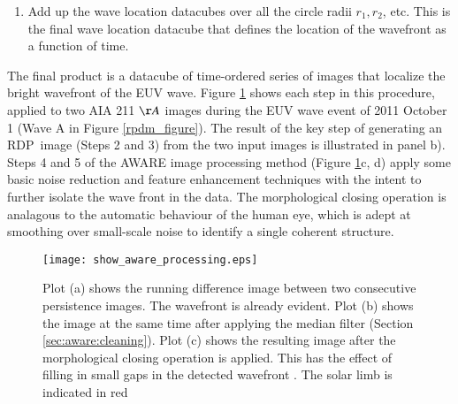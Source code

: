 \documentclass[referee,a4paper,12pt,traditabstract]{swsc}
\newcommand{\RDP}{RDP}
\begin{document}
\begin{linenumbers}
\begin{enumerate}
\begin{enumerate}
\item Apply a morphological closing operation.  This operation helps
  close small ‘cracks’ in structures \citep{2002dip..book.....G}.  The
  structuring element used is the same as that used by the median
  filtering operation. The final image is shown in Figure
  \ref{method_figure}d.  The final result is a datacube of images that
  show the location of the wavefront as a function of time, given the
  median filter and closing operations performed at length-scale $r$.
\end{enumerate}

\item Add up the wave location datacubes over all the circle radii
  $r_{1}, r_{2}$\textellipsis, etc.  This is the final wave location
  datacube that defines the location of the wavefront as a function of
  time.

\end{enumerate}

The final product is a datacube of time-ordered series of images that
localize the bright wavefront of the EUV wave.  Figure
\ref{method_figure} shows each step in this procedure, applied to two
AIA 211 $\AA$ images during the EUV wave event of 2011 October 1 (Wave
A in Figure \ref{rpdm_figure}).  The result of the key step of
generating an \RDP\ image (Steps 2 and 3) from the two input images is
illustrated in panel b). Steps 4 and 5 of the AWARE image processing
method (Figure \ref{method_figure}c, d) apply some basic noise
reduction and feature enhancement techniques with the intent to
further isolate the wave front in the data. The morphological closing
operation is analagous to the automatic behaviour of the human eye,
which is adept at smoothing over small-scale noise to identify a
single coherent structure.

\begin{figure}
\begin{center}
\texttt{[image: show\_aware\_processing.eps]}
\caption{Plot (a) shows the running difference image between two
  consecutive persistence images. The wavefront is already
  evident. Plot (b) shows the image at the same time after applying
  the median filter (Section \ref{sec:aware:cleaning}).  Plot (c)
  shows the resulting image after the morphological closing operation
  is applied.  This has the effect of filling in small gaps in the
  detected wavefront \citep[e.g.][]{2002dip..book.....G}. The solar
  limb is indicated in red}
\label{method_figure}
\end{center}
\end{figure}


\end{linenumbers}
\end{document}
